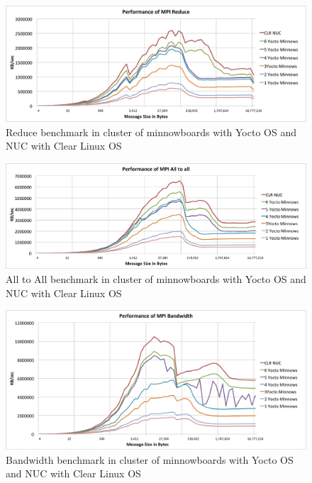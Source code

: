 \begin{figure}[H]
\centering
\includegraphics[width=1.0\textwidth]{images/mpbench_cluster_experiments/mpi_reduce.png}
\caption{Reduce  benchmark in cluster of minnowboards with Yocto OS and NUC
with Clear Linux OS}
\label{reduce_cluster}
\end{figure}



\begin{figure}[H]
\centering
\includegraphics[width=1.0\textwidth]{images/mpbench_cluster_experiments/mpi_alltoall.png}
\caption{All to All  benchmark in cluster of minnowboards with Yocto OS and NUC
with Clear Linux OS}
\label{all_to_all_cluster}
\end{figure}


\begin{figure}[H]
\centering
\includegraphics[width=1.0\textwidth]{images/mpbench_cluster_experiments/mpi_bandwidth.png}
\caption{Bandwidth  benchmark in cluster of minnowboards with Yocto OS and NUC
with Clear Linux OS}
\label{all_to_all_cluster}
\end{figure}

